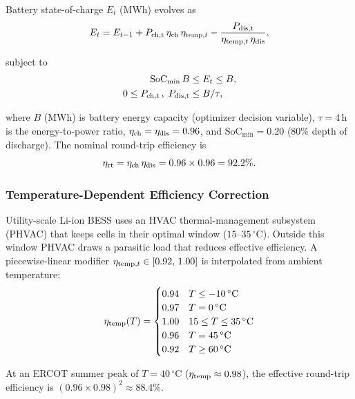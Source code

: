 \documentclass[conference]{IEEEtran}
\begin{document}
Battery state-of-charge $E_t$ (MWh) evolves as
%
\begin{equation}
  E_t = E_{t-1}
      + P_{\rm ch,t}\,\eta_{\rm ch}\,\eta_{{\rm temp},t}
      - \frac{P_{\rm dis,t}}{\eta_{{\rm temp},t}\,\eta_{\rm dis}},
  \label{eq:bess}
\end{equation}

\noindent subject to
%
\begin{align}
  \mathrm{SoC}_{\min}\,B &\leq E_t \leq B, \label{eq:soc} \\
  0 \leq P_{\rm ch,t}\,,\; P_{\rm dis,t} &\leq B/\tau, \label{eq:power}
\end{align}

\noindent where $B$ (MWh) is battery energy capacity (optimizer decision
variable), $\tau=4$\,h is the energy-to-power ratio,
$\eta_{\rm ch} = \eta_{\rm dis} = 0.96$, and
$\mathrm{SoC}_{\min} = 0.20$ (80\% depth of discharge).
The nominal round-trip efficiency is
%
\begin{equation}
  \eta_{\rm rt} = \eta_{\rm ch}\,\eta_{\rm dis}
               = 0.96 \times 0.96 = 92.2\%.
  \label{eq:eta_rt}
\end{equation}

\subsubsection{Temperature-Dependent Efficiency Correction}

Utility-scale Li-ion BESS uses an HVAC thermal-management subsystem
(PHVAC) that keeps cells in their optimal window ($15$--$35\,^\circ$C).
Outside this window PHVAC draws a parasitic load that reduces effective
efficiency.
A piecewise-linear modifier $\eta_{{\rm temp},t}\in[0.92,\,1.00]$ is
interpolated from ambient temperature:
%
\begin{equation}
  \eta_{\rm temp}(T) =
  \begin{cases}
    0.94 & T \leq -10\,^\circ\mathrm{C} \\
    0.97 & T = 0\,^\circ\mathrm{C} \\
    1.00 & 15 \leq T \leq 35\,^\circ\mathrm{C} \\
    0.96 & T = 45\,^\circ\mathrm{C} \\
    0.92 & T \geq 60\,^\circ\mathrm{C}
  \end{cases}
  \label{eq:eta_temp}
\end{equation}

At an ERCOT summer peak of $T=40\,^\circ$C ($\eta_{\rm temp}\approx 0.98$),
the effective round-trip efficiency is
$(0.96\times0.98)^2 \approx 88.4\%$.
\end{document}
